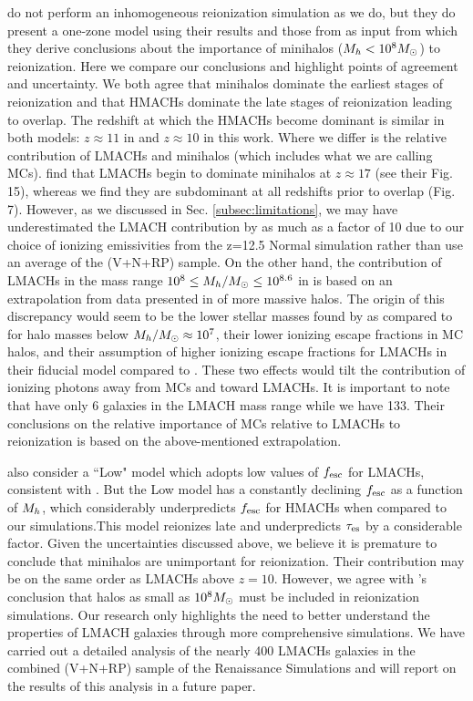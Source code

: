 \documentclass[iop,apj]{emulateapj}
\begin{document}
\cite{Kimm17} do not perform an inhomogeneous reionization simulation as we do, but they do present a one-zone model using their results and those from \cite{KimmCen14} as input from which they derive conclusions about the importance of minihalos ($\mh < 10^8\Ms$) to reionization. Here we compare our conclusions and highlight points of agreement and uncertainty. We both agree that minihalos dominate the earliest stages of reionization and that HMACHs dominate the late stages of reionization leading to overlap. The redshift at which the HMACHs become dominant is similar in both models: $z\approx 11$ in \cite{Kimm17} and $z\approx 10$ in this work. Where we differ is the relative contribution of LMACHs and minihalos (which includes what we are calling MCs). \cite{Kimm17} find that LMACHs begin to dominate minihalos at $z\approx 17$ (see their Fig. 15), whereas we find they are subdominant at all redshifts prior to overlap (Fig. 7). However, as we discussed in Sec. \ref{subsec:limitations}, we may have underestimated the LMACH contribution by as much as a factor of 10 due to our choice of ionizing emissivities from the z=12.5 Normal simulation rather than use an average of the (V+N+RP) sample. On the other hand, the contribution of LMACHs in the mass range $10^8 \leq \mh/\Ms \leq 10^{8.6}$ in \cite{Kimm17} is based on an extrapolation from data presented in \cite{KimmCen14} of more massive halos. The origin of this discrepancy would seem to be the lower stellar masses found by \cite{Kimm17} as compared to \cite{Xu16} for halo masses below $\mh/\Ms \approx 10^7$, their lower ionizing escape fractions in MC halos, and their assumption of higher ionizing escape fractions for LMACHs in their fiducial model compared to \cite{Xu16}. These two effects would tilt the contribution of ionizing photons away from MCs and toward LMACHs. It is important to note that \cite{Kimm17} have only 6 galaxies in the LMACH mass range while we have 133. Their conclusions on the relative importance of MCs relative to LMACHs to reionization is based on the above-mentioned  extrapolation.

\cite{Kimm17} also consider a ``Low" model which adopts low values of $f_{\rm esc}$ for LMACHs, consistent with \cite{Xu16}. But the Low model has a constantly declining $f_{\rm esc}$ as a function of $M_h$, which considerably underpredicts $f_{\rm esc}$ for HMACHs when compared to our simulations.This model reionizes late and underpredicts $\tau_{\rm es}$ by a considerable factor.  Given the uncertainties discussed above, we believe it is premature to conclude that minihalos are unimportant for reionization. Their contribution may be on the same order as LMACHs above $z=10$. However, we agree with \cite{Kimm17}'s conclusion that halos as small as $10^8\Ms$ must be included in reionization simulations. Our research only highlights the need to better understand the properties of LMACH galaxies through more comprehensive simulations. We have carried out a detailed analysis of the nearly 400 LMACHs galaxies in the combined (V+N+RP) sample of the Renaissance Simulations and will report on the results of this analysis in a future paper.
\end{document}

